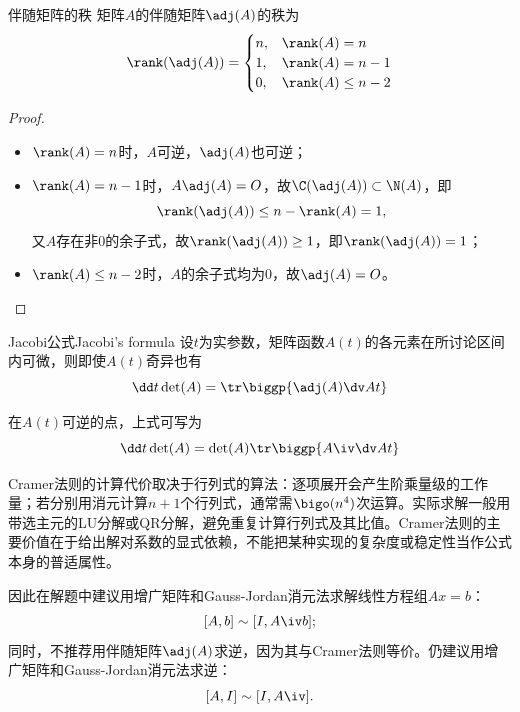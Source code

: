 \begin{theorem}
	{伴随矩阵的秩}{}
	矩阵$A$的伴随矩阵$\adj(A)$的秩为
	\begin{equation}
		\rank(\adj(A))=\begin{cases}
			n,&\rank(A)=n\\
			1,&\rank(A)=n-1\\
			0,&\rank(A)\leq n-2\\
		\end{cases}
	\end{equation}
\end{theorem}

\begin{proof}
	~
	\begin{itemize}
		\item $\rank(A)=n$时，$A$可逆，$\adj(A)$也可逆；
		
		\item $\rank(A)=n-1$时，$A\adj(A)=O$，故$\C(\adj(A))\subset\N(A)$，即
		\[
			\rank(\adj(A))\leq n-\rank(A)=1,
		\]
		又$A$存在非0的余子式，故$\rank(\adj(A))\geq 1$，即$\rank(\adj(A))=1$；
	
		\item $\rank(A)\leq n-2$时，$A$的余子式均为0，故$\adj(A)=O$。
		\qedhere
	\end{itemize}
\end{proof}

\begin{theorem}
	{Jacobi公式}{Jacobi's formula}
	设$t$为实参数，矩阵函数$A(t)$的各元素在所讨论区间内可微，则即使$A(t)$奇异也有
	\begin{equation}
		\label{eqn:Jacobi det'}
		\dd t\det(A)=\tr\biggp{\adj(A)\dv At}
	\end{equation}
\end{theorem}

\begin{corollary}
	在$A(t)$可逆的点，上式可写为
	\begin{equation}
		\dd t\det(A)=\det(A)\tr\biggp{A\iv\dv At}
	\end{equation}
\end{corollary}

\begin{remark}
	Cramer法则的计算代价取决于行列式的算法：逐项展开会产生阶乘量级的工作量；若分别用消元计算$n+1$个行列式，通常需$\bigo(n^4)$次运算。实际求解一般用带选主元的LU分解或QR分解，避免重复计算行列式及其比值。Cramer法则的主要价值在于给出解对系数的显式依赖，不能把某种实现的复杂度或稳定性当作公式本身的普适属性。

	因此在解题中建议用增广矩阵和Gauss-Jordan消元法求解线性方程组$Ax=b$：
	\[
		[A,b]\sim[I,A\iv b];
	\]
	同时，不推荐用伴随矩阵$\adj(A)$求逆，因为其与Cramer法则等价。仍建议用增广矩阵和Gauss-Jordan消元法求逆：
	\[
		[A,I]\sim[I,A\iv].
	\]
\end{remark}
